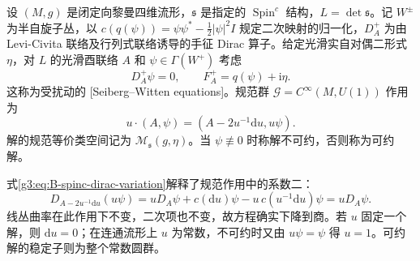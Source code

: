 \begin{definition}\label{g3:def:B-sw-equations}
 设 \((M,g)\) 是闭定向黎曼四维流形，\(\mathfrak s\) 是指定的
 \(\operatorname{Spin}^c\) 结构，\(L=\det\mathfrak s\)。记 \(W^\pm\) 为半自旋子丛，以 \(c(q(\psi))=\psi\psi^*-\tfrac12|\psi|^2I\) 规定二次映射的归一化，\(D_A^+\) 为由 Levi-Civita 联络及行列式联络诱导的手征 Dirac 算子。给定光滑实自对偶二形式 \(\eta\)，对 \(L\) 的光滑酉联络 \(A\) 和 \(\psi\in\Gamma(W^+)\) 考虑
 \begin{equation}\label{g3:eq:B-sw-equations}
 D_A^+\psi=0,\qquad F_A^+=q(\psi)+\mathrm i\eta.
 \end{equation}
 这称为受扰动的 [Seiberg--Witten equations]。规范群 \(\mathcal G=C^\infty(M,U(1))\) 作用为
 \begin{equation}\label{g3:eq:B-sw-gauge}
 u\cdot(A,\psi)=(A-2u^{-1}\mathrm du,u\psi).
 \end{equation}
 解的规范等价类空间记为 \(\mathcal M_{\mathfrak s}(g,\eta)\)。当 \(\psi\not\equiv0\) 时称解不可约，否则称为可约解。
\end{definition}

式\eqref{g3:eq:B-spinc-dirac-variation}解释了规范作用中的系数二：
\[
 D_{A-2u^{-1}\mathrm du}(u\psi)
 =uD_A\psi+c(\mathrm du)\psi-u\,c(u^{-1}\mathrm du)\psi
 =uD_A\psi.
\]
线丛曲率在此作用下不变，二次项也不变，故方程确实下降到商。若 \(u\) 固定一个解，则 \(\mathrm du=0\)；在连通流形上 \(u\) 为常数，不可约时又由 \(u\psi=\psi\) 得 \(u=1\)。可约解的稳定子则为整个常数圆群。

